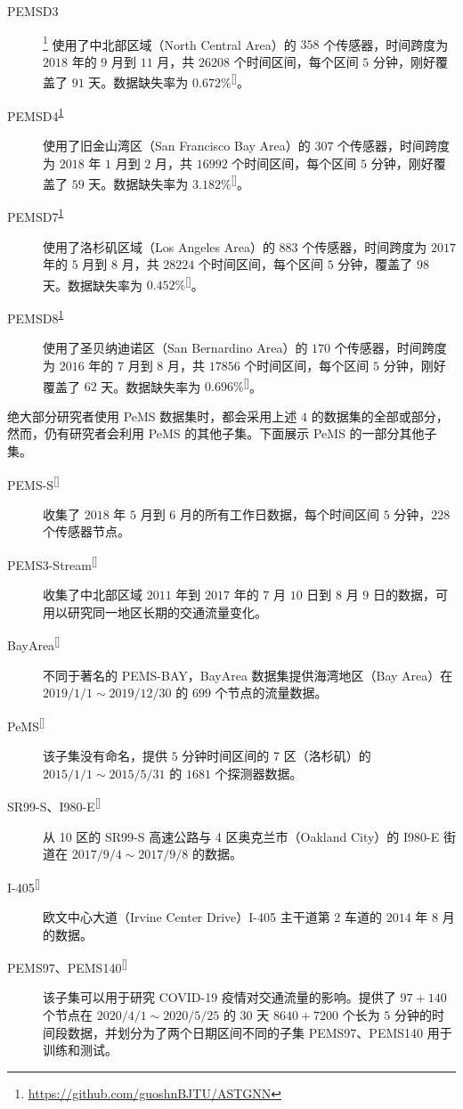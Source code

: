\documentclass{ctexart}
\renewcommand{\cite}[1]{\textsuperscript{[\citenum{#1}]}}
\begin{document}
\begin{description}
    \item[PEMSD3]\footnote{\url{https://github.com/guoshnBJTU/ASTGNN}\label{pems0x}} 使用了中北部区域（North Central Area）的 $358$ 个传感器，时间跨度为 $2018$ 年的 $9$ 月到 $11$ 月，共 $26208$ 个时间区间，每个区间 $5$ 分钟，刚好覆盖了 $91$ 天。数据缺失率为 $0.672\%$\cite{T-158}。
    \item[PEMSD4\textsuperscript{\ref{pems0x}}] 使用了旧金山湾区（San Francisco Bay Area）的 $307$ 个传感器，时间跨度为 $2018$ 年 $1$ 月到 $2$ 月，共 $16992$ 个时间区间，每个区间 $5$ 分钟，刚好覆盖了 $59$ 天。数据缺失率为 $3.182\%$\cite{T-158}。
    \item[PEMSD7\textsuperscript{\ref{pems0x}}] 使用了洛杉矶区域（Los Angeles Area）的 $883$ 个传感器，时间跨度为 $2017$ 年的 $5$ 月到 $8$ 月，共 $28224$ 个时间区间，每个区间 $5$ 分钟，覆盖了 $98$ 天。数据缺失率为 $0.452\%$\cite{T-158}。
    \item[PEMSD8\textsuperscript{\ref{pems0x}}] 使用了圣贝纳迪诺区（San Bernardino Area）的 $170$ 个传感器，时间跨度为 $2016$ 年的 $7$ 月到 $8$ 月，共 $17856$ 个时间区间，每个区间 $5$ 分钟，刚好覆盖了 $62$ 天。数据缺失率为 $0.696\%$\cite{T-158}。
\end{description}

绝大部分研究者使用 PeMS 数据集时，都会采用上述 $4$ 的数据集的全部或部分，然而，仍有研究者会利用 PeMS 的其他子集。下面展示 PeMS 的一部分其他子集。

\begin{description}
    \item[PEMS-S\cite{T-140}] 收集了 $2018$ 年 $5$ 月到 $6$ 月的所有工作日数据，每个时间区间 $5$ 分钟，$228$ 个传感器节点。%
    \item[PEMS3-Stream\cite{T-310}] 收集了中北部区域 $2011$ 年到 $2017$ 年的 $7$ 月 $10$ 日到 $8$ 月 $9$ 日的数据，可用以研究同一地区长期的交通流量变化。
    \item[BayArea\cite{T-151}] 不同于著名的 PEMS-BAY，BayArea 数据集提供海湾地区（Bay Area）在 $2019/1/1\sim 2019/12/30$ 的 $699$ 个节点的流量数据。
    \item[PeMS\cite{T-174}] 该子集没有命名，提供 $5$ 分钟时间区间的 7 区（洛杉矶）的 $2015/1/1\sim 2015/5/31$ 的 $1681$ 个探测器数据。
    \item[SR99-S、I980-E\cite{T-181}] 从 10 区的 SR99-S 高速公路与 4 区奥克兰市（Oakland City）的 I980-E 街道在 $2017/9/4\sim2017/9/8$ 的数据。
    \item[I-405\cite{T-222}] 欧文中心大道（Irvine Center Drive）I-405 主干道第 2 车道的 $2014$ 年 $8$ 月的数据。
    \item[PEMS97、PEMS140\cite{T-348}] 该子集可以用于研究 COVID-19 疫情对交通流量的影响。提供了 $97+140$ 个节点在 $2020/4/1\sim2020/5/25$ 的 $30$ 天 $8640+7200$ 个长为 $5$ 分钟的时间段数据，并划分为了两个日期区间不同的子集 PEMS97、PEMS140 用于训练和测试。
\end{description}
\end{document}
